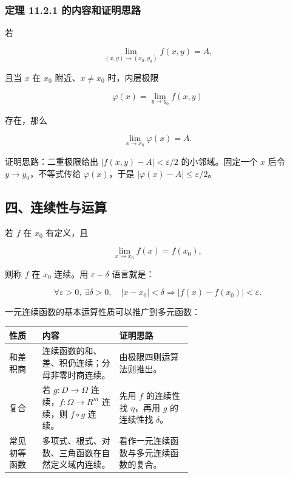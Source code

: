 \subsubsection*{定理 11.2.1 的内容和证明思路}

若

\[
      \lim_{(x,y)\to(x_0,y_0)}f(x,y)=A,
    \]

且当 \(x\) 在 \(x_0\) 附近、\(x\ne x_0\) 时，内层极限

\[
      \varphi(x)=\lim_{y\to y_0}f(x,y)
    \]

存在，那么

\[
      \lim_{x\to x_0}\varphi(x)=A.
    \]

证明思路：二重极限给出 \(|f(x,y)-A|<\varepsilon/2\) 的小邻域。固定一个 \(x\) 后令 \(y\to y_0\)，不等式传给 \(\varphi(x)\)，于是 \(|\varphi(x)-A|\le\varepsilon/2\)。

\subsection*{四、连续性与运算}

若 \(f\) 在 \(x_0\) 有定义，且

\[
      \lim_{x\to x_0}f(x)=f(x_0),
    \]

则称 \(f\) 在 \(x_0\) 连续。用 \(\varepsilon-\delta\) 语言就是：

\[
      \forall\varepsilon>0,\ \exists\delta>0,\quad
      |x-x_0|<\delta
      \Longrightarrow |f(x)-f(x_0)|<\varepsilon.
    \]

一元连续函数的基本运算性质可以推广到多元函数：

\begin{center}
\small
\begin{tabularx}{\linewidth}{|>{\raggedright\arraybackslash}p{0.18\linewidth}|>{\raggedright\arraybackslash}p{0.42\linewidth}|>{\raggedright\arraybackslash}X|}
\hline
\textbf{性质} & \textbf{内容} & \textbf{证明思路} \\ \hline
和差积商 & 连续函数的和、差、积仍连续；分母非零时商连续。 & 由极限四则运算法则推出。 \\ \hline
复合 & 若 \(g:D\to\Omega\) 连续，\(f:\Omega\to R^m\) 连续，则 \(f\circ g\) 连续。 & 先用 \(f\) 的连续性找 \(\eta\)，再用 \(g\) 的连续性找 \(\delta\)。 \\ \hline
常见初等函数 & 多项式、根式、对数、三角函数在自然定义域内连续。 & 看作一元连续函数与多元连续函数的复合。 \\ \hline
\end{tabularx}
\end{center}

